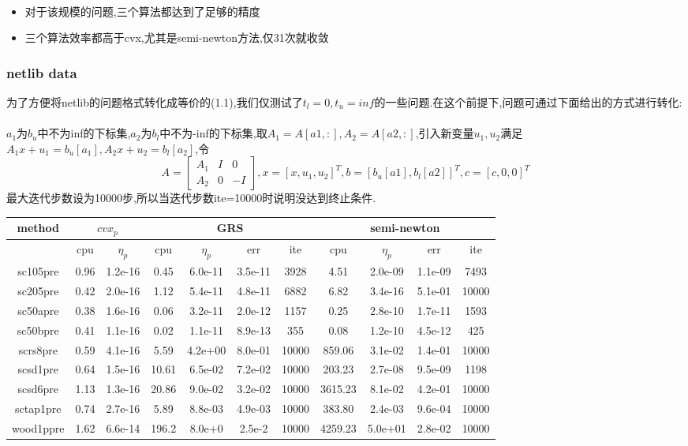 \documentclass[UTF8]{ctexart}
\begin{document}
\paragraph{}
\begin{itemize}
  \item 对于该规模的问题,三个算法都达到了足够的精度
  \item 三个算法效率都高于cvx,尤其是semi-newton方法,仅31次就收敛
\end{itemize}
\subsubsection{netlib data}
为了方便将netlib的问题格式转化成等价的(1.1),我们仅测试了$t_l=0,t_u=inf$的一些问题.在这个前提下,问题可通过下面给出的方式进行转化:
\paragraph{}
$a_1$为$b_u$中不为inf的下标集,$a_2$为$b_l$中不为-inf的下标集,取$A_1=A[a1,:],A_2=A[a2,:]$,引入新变量$u_1,u_2$满足$A_1x+u_1=b_u[a_1],A_2x+u_2=b_l[a_2]$,令
\begin{equation*}
  A = \left[
  \begin{matrix}
    A_1 & I & 0\\
    A_2 & 0 & -I
  \end{matrix}
  \right],
  x = [x,u_1,u_2]^T,b=[b_u[a1],b_l[a2]]^T,c=[c,0,0]^T
\end{equation*}
最大迭代步数设为10000步,所以当迭代步数ite=10000时说明没达到终止条件.\\
\begin{tabular}{|c|c|c|c|c|c|c|c|c|c|c|}
  \hline
  method& \multicolumn{2}{c|}{$cvx_p$} &\multicolumn{4}{c|}{GRS} &\multicolumn{4}{c|}{semi-newton}\\
  \hline
  &cpu&$\eta_p$&cpu&$\eta_p$&err&ite&cpu&$\eta_p$&err&ite\\
  \hline
  sc105pre &0.96 & 1.2e-16 & 0.45 & 6.0e-11 & 3.5e-11 & 3928& 4.51 & 2.0e-09 & 1.1e-09 & 7493\\
  sc205pre &0.42 & 2.0e-16 & 1.12 & 5.4e-11 & 4.8e-11 & 6882& 6.82 & 3.4e-16 & 5.1e-01 & 10000\\
  sc50apre &0.38 & 1.6e-16 & 0.06 & 3.2e-11 & 2.0e-12 & 1157& 0.25 & 2.8e-10 & 1.7e-11 & 1593\\
  sc50bpre &0.41 & 1.1e-16 & 0.02 & 1.1e-11 & 8.9e-13 & 355& 0.08 & 1.2e-10 & 4.5e-12 & 425\\
  scrs8pre &0.59 & 4.1e-16 & 5.59 & 4.2e+00 & 8.0e-01 & 10000& 859.06 & 3.1e-02 & 1.4e-01 & 10000\\
  scsd1pre &0.64 & 1.5e-16 & 10.61 & 6.5e-02 & 7.2e-02 & 10000& 203.23 & 2.7e-08 & 9.5e-09 & 1198\\
  scsd6pre &1.13 & 1.3e-16 & 20.86 & 9.0e-02 & 3.2e-02 & 10000&3615.23 & 8.1e-02 & 4.2e-01 & 10000\\
  sctap1pre&0.74 & 2.7e-16 & 5.89 & 8.8e-03 & 4.9e-03 & 10000& 383.80 & 2.4e-03 & 9.6e-04 & 10000\\
  wood1ppre&1.62 & 6.6e-14 & 196.2 & 8.0e+0 & 2.5e-2 & 10000& 4259.23 & 5.0e+01 & 2.8e-02 & 10000\\
  \hline
\end{tabular}
\end{document}
